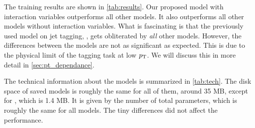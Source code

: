 The training results are shown in \cref{tab:results}. 
Our proposed \depart model with interaction variables outperforms all other models.
It also outperforms all other models without interaction variables.
What is fascinating is that the previously used model on jet tagging, \bdt, gets obliterated by \emph{all} other models.
However, the differences between the models are not as significant as expected.
This is due to the physical limit of the tagging task at low $p_\text{T}$.
We will discuss this in more detail in \cref{sec:pt_dependance}.

The technical information about the models is summarized in \cref{tab:tech}.
The disk space of saved models is roughly the same for all of them, around 35 MB, except for \bdt, which is 1.4 MB.
It is given by the number of total parameters, which is roughly the same for all models.
The tiny differences did not affect the performance.

